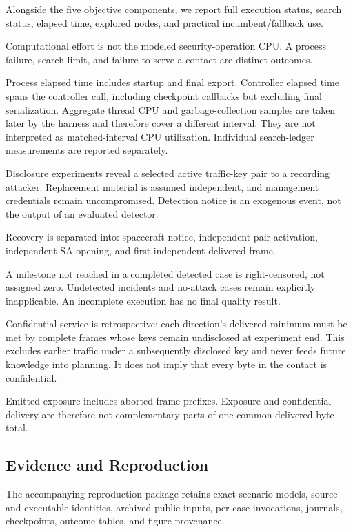 \documentclass[conference]{IEEEtran}
\begin{document}
Alongside the five objective components, we report full
execution status, search status, elapsed time, explored nodes,
and practical incumbent/fallback use.

Computational effort is not the modeled security-operation CPU.
A process failure, search limit, and failure to serve a contact
are distinct outcomes.

Process elapsed time includes startup and final export.
Controller elapsed time spans the controller call, including
checkpoint callbacks but excluding final serialization.
Aggregate thread CPU and garbage-collection samples are taken
later by the harness and therefore cover a different interval.
They are not interpreted as matched-interval CPU utilization.
Individual search-ledger measurements are reported separately.

Disclosure experiments reveal a selected active traffic-key
pair to a recording attacker.
Replacement material is assumed independent, and management
credentials remain uncompromised.
Detection notice is an exogenous event, not the output of
an evaluated detector.

Recovery is separated into:
spacecraft notice,
independent-pair activation,
independent-SA opening, and
first independent delivered frame.

A milestone not reached in a completed detected case is
right-censored, not assigned zero.
Undetected incidents and no-attack cases remain explicitly
inapplicable.
An incomplete execution has no final quality result.

Confidential service is retrospective:
each direction's delivered minimum must be met by complete
frames whose keys remain undisclosed at experiment end.
This excludes earlier traffic under a subsequently disclosed
key and never feeds future knowledge into planning.
It does not imply that every byte in the contact is confidential.

Emitted exposure includes aborted frame prefixes.
Exposure and confidential delivery are therefore not
complementary parts of one common delivered-byte total.

\subsection{Evidence and Reproduction}

The accompanying reproduction package retains exact scenario
models, source and executable identities, archived public
inputs, per-case invocations, journals, checkpoints, outcome
tables, and figure provenance.
\end{document}

